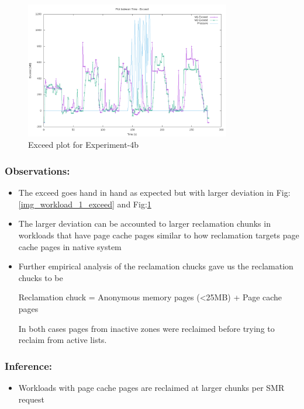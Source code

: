 	\begin{figure}
	  \centering
	  \includegraphics[width=0.8\textwidth]{images/experimentation/workload/2/Exceed.png}
	  \caption{Exceed plot for Experiment-4b}
	  \label{img_workload_2_exceed}
	\end{figure}	
	  
	\subsubsection{Observations:}
	
	\begin{itemize}
	  \item The exceed goes hand in hand as expected but with larger deviation in Fig:\ref{img_workload_1_exceed} and 
Fig:\ref{img_workload_2_exceed}
	  \item The larger deviation can be accounted to larger reclamation chunks in workloads that have page cache pages similar to how 
reclamation targets page cache pages in native system
	  \item Further empirical analysis of the reclamation chucks gave us the reclamation chucks to be 
	      \begin{center}
		  Reclamation chuck = Anonymous memory pages (\textless 25MB) + Page cache pages
	      \end{center}
	      In both cases pages from inactive zones were reclaimed before trying to reclaim from active lists.
	\end{itemize}

	\subsubsection{Inference:}
	
	\begin{itemize}
	  \item Workloads with page cache pages are reclaimed at larger chunks per SMR request
	\end{itemize}
      
